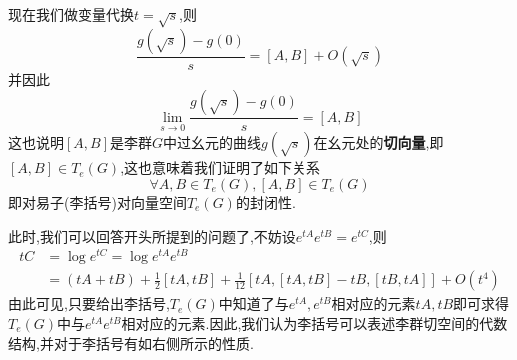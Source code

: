 现在我们做变量代换$t=\sqrt{s}$,则
\begin{equation}
    \frac{g(\sqrt{s})-g(0)}{s}=[A,B]+O(\sqrt{s})
\end{equation}
并因此
\begin{equation}
    \lim_{s\to0}\frac{g(\sqrt{s})-g(0)}{s}=[A,B]
\end{equation}
这也说明$[A,B]$是李群$G$中过幺元的曲线$g(\sqrt{s})$在幺元处的\textbf{切向量},即$[A,B]\in T_e(G)$,这也意味着我们证明了如下关系
\begin{equation}
    \forall A,B\in T_{e}(G) , [A,B]\in T_{e}(G)
\end{equation}
即对易子(李括号)对向量空间$T_e(G)$的封闭性.


此时,我们可以回答开头所提到的问题了,不妨设$e^{tA}e^{tB}=e^{tC}$,则
\begin{equation}
\begin{aligned}
    tC&=\log e^{tC}=\log e^{tA}e^{tB}\\
    &=(tA+tB)+\frac{1}{2}[tA,tB]+\frac{1}{12}[tA,[tA,tB]-tB,[tB,tA]]+O(t^{4}) 
\end{aligned}
\end{equation}
由此可见,只要给出李括号,$T_e(G)$中知道了与$e^{tA},e^{tB}$相对应的元素$tA,tB$即可求得$T_e(G)$中与$e^{tA}e^{tB}$相对应的元素.因此,我们认为李括号可以表述李群切空间的代数结构,并对于李括号有如右侧所示的性质.
